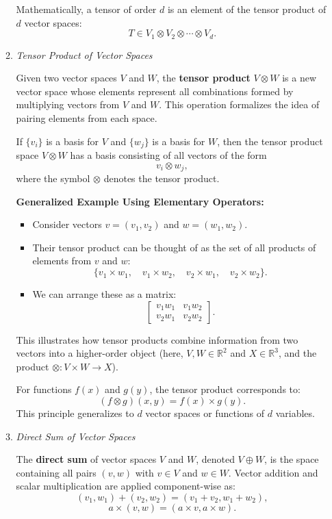 \documentclass[titlepage]{article}
\begin{document}
\begin{itemize}
\begin{enumerate}
    Mathematically, a tensor of order $d$ is an element of the tensor product of $d$ vector spaces:
    \[
    T \in V_1 \otimes V_2 \otimes \cdots \otimes V_d.
    \]
    
    \item \textit{Tensor Product of Vector Spaces}
    
    Given two vector spaces $V$ and $W$, the \textbf{tensor product} $V \otimes W$ is a new vector space whose elements represent all combinations formed by multiplying vectors from $V$ and $W$. This operation formalizes the idea of pairing elements from each space.
    
    If $\{v_i\}$ is a basis for $V$ and $\{w_j\}$ is a basis for $W$, then the tensor product space $V \otimes W$ has a basis consisting of all vectors of the form
    \[
    v_i \otimes w_j,
    \]
    where the symbol $\otimes$ denotes the tensor product.
    
    \textbf{Generalized Example Using Elementary Operators:}
    \begin{itemize}
    \item Consider vectors $v = (v_1, v_2)$ and $w = (w_1, w_2)$.
    \item Their tensor product can be thought of as the set of all products of elements from $v$ and $w$:
    \[
    \{ v_1 \times w_1, \quad v_1 \times w_2, \quad v_2 \times w_1, \quad v_2 \times w_2 \}.
    \]
    \item We can arrange these as a matrix:
    \[
    \begin{bmatrix}
    v_1 w_1 & v_1 w_2 \\
    v_2 w_1 & v_2 w_2
    \end{bmatrix}.
    \]
    \end{itemize}
    This illustrates how tensor products combine information from two vectors into a higher-order object (here, $V,W \in \mathbb{R}^2$ and $X \in \mathbb{R}^3$, and the product $\otimes:V \times W \to X$).
    
    For functions $f(x)$ and $g(y)$, the tensor product corresponds to:
    \[
    (f \otimes g)(x,y) = f(x) \times g(y).
    \]
    This principle generalizes to $d$ vector spaces or functions of $d$ variables.
    
    \item \textit{Direct Sum of Vector Spaces}
    
    The \textbf{direct sum} of vector spaces $V$ and $W$, denoted $V \oplus W$, is the space containing all pairs $(v,w)$ with $v \in V$ and $w \in W$. Vector addition and scalar multiplication are applied component-wise as:
    \[
    (v_1, w_1) + (v_2, w_2) = (v_1 + v_2, w_1 + w_2),
    \]
    \[
    a \times (v, w) = (a \times v, a \times w).
    \]
    

\end{enumerate}
\end{itemize}
\end{document}

